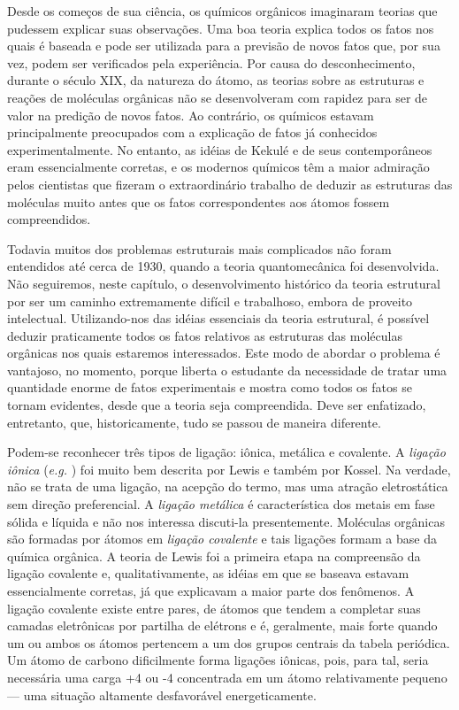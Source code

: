 Desde os começos de sua ciência, os químicos orgânicos imaginaram teorias que pudessem explicar suas observações. Uma boa teoria explica todos os fatos nos quais é baseada e pode ser utilizada para a previsão de novos fatos que, por sua vez, podem ser verificados pela experiência. Por causa do desconhecimento, durante o século XIX, da natureza do átomo, as teorias sobre as estruturas e reações de moléculas orgânicas não se desenvolveram com rapidez para ser de valor na predição de novos fatos. Ao contrário, os químicos estavam principalmente preocupados com a explicação de fatos já conhecidos experimentalmente. No entanto, as idéias de Kekulé e de seus contemporâneos eram essencialmente corretas, e os modernos químicos têm a maior admiração pelos cientistas que fizeram o extraordinário trabalho de deduzir as estruturas das moléculas muito antes que os fatos correspondentes aos átomos fossem compreendidos. 

Todavia muitos dos problemas estruturais mais complicados não foram entendidos até cerca de 1930, quando a teoria quantomecânica foi desenvolvida. Não seguiremos, neste capítulo, o desenvolvimento histórico da teoria estrutural por ser um caminho extremamente difícil e trabalhoso, embora de proveito intelectual. Utilizando-nos das idéias essenciais da teoria estrutural, é possível deduzir praticamente todos os fatos relativos as estruturas das moléculas orgânicas nos quais estaremos interessados. Este modo de abordar o problema é vantajoso, no momento, porque liberta o estudante da necessidade de tratar uma quantidade enorme de fatos experimentais e mostra como todos os fatos se tornam evidentes, desde que a teoria seja compreendida. Deve ser enfatizado, entretanto, que, historicamente, tudo se passou de maneira diferente. 

Podem-se reconhecer três tipos de ligação: iônica, metálica e covalente. A \textit{ligação iônica} (\textit{e.g.} ) foi muito bem descrita por Lewis e também por Kossel. Na verdade, não se trata de uma ligação, na acepção do termo, mas uma atração eletrostática sem direção preferencial. A \textit{ligação metálica} é característica dos metais em fase sólida e líquida e não nos interessa discuti-la presentemente. Moléculas orgânicas são formadas por átomos em \textit{ligação covalente} e tais ligações formam a base da química orgânica. A teoria de Lewis foi a primeira etapa na compreensão da ligação covalente e, qualitativamente, as idéias em que se baseava estavam essencialmente corretas, já que explicavam a maior parte dos fenômenos. A ligação covalente existe entre pares, de átomos que tendem a completar suas camadas eletrônicas por partilha de elétrons e é, geralmente, mais forte quando um ou ambos os átomos pertencem a um dos grupos centrais da tabela periódica. Um átomo de carbono dificilmente forma ligações iônicas, pois, para tal, seria necessária uma carga +4 ou -4 concentrada em um átomo relativamente pequeno — uma situação altamente desfavorável energeticamente.

